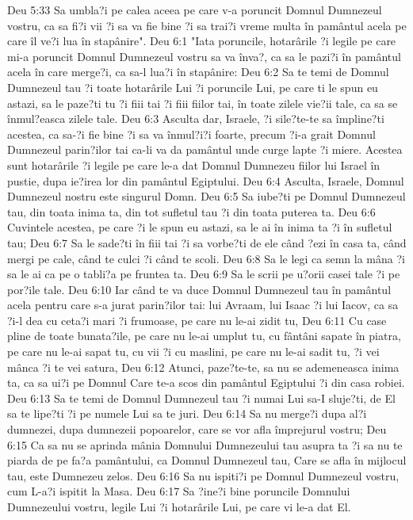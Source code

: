 Deu 5:33  Sa umbla?i pe calea aceea pe care v-a poruncit Domnul Dumnezeul vostru, ca sa fi?i vii ?i sa va fie bine ?i sa trai?i vreme multa în pamântul acela pe care îl ve?i lua în stapânire".
Deu 6:1  "Iata poruncile, hotarârile ?i legile pe care mi-a poruncit Domnul Dumnezeul vostru sa va înva?, ca sa le pazi?i în pamântul acela în care merge?i, ca sa-l lua?i în stapânire:
Deu 6:2  Sa te temi de Domnul Dumnezeul tau ?i toate hotarârile Lui ?i poruncile Lui, pe care ti le spun eu astazi, sa le paze?ti tu ?i fiii tai ?i fiii fiilor tai, în toate zilele vie?ii tale, ca sa se înmul?easca zilele tale.
Deu 6:3  Asculta dar, Israele, ?i sile?te-te sa împline?ti acestea, ca sa-?i fie bine ?i sa va înmul?i?i foarte, precum ?i-a grait Domnul Dumnezeul parin?ilor tai ca-li va da pamântul unde curge lapte ?i miere. Acestea sunt hotarârile ?i legile pe care le-a dat Domnul Dumnezeu fiilor lui Israel în pustie, dupa ie?irea lor din pamântul Egiptului.
Deu 6:4  Asculta, Israele, Domnul Dumnezeul nostru este singurul Domn.
Deu 6:5  Sa iube?ti pe Domnul Dumnezeul tau, din toata inima ta, din tot sufletul tau ?i din toata puterea ta.
Deu 6:6  Cuvintele acestea, pe care ?i le spun eu astazi, sa le ai în inima ta ?i în sufletul tau;
Deu 6:7  Sa le sade?ti în fiii tai ?i sa vorbe?ti de ele când ?ezi în casa ta, când mergi pe cale, când te culci ?i când te scoli.
Deu 6:8  Sa le legi ca semn la mâna ?i sa le ai ca pe o tabli?a pe fruntea ta.
Deu 6:9  Sa le scrii pe u?orii casei tale ?i pe por?ile tale.
Deu 6:10  Iar când te va duce Domnul Dumnezeul tau în pamântul acela pentru care s-a jurat parin?ilor tai: lui Avraam, lui Isaac ?i lui Iacov, ca sa ?i-l dea cu ceta?i mari ?i frumoase, pe care nu le-ai zidit tu,
Deu 6:11  Cu case pline de toate bunata?ile, pe care nu le-ai umplut tu, cu fântâni sapate în piatra, pe care nu le-ai sapat tu, cu vii ?i cu maslini, pe care nu le-ai sadit tu, ?i vei mânca ?i te vei satura,
Deu 6:12  Atunci, paze?te-te, sa nu se ademeneasca inima ta, ca sa ui?i pe Domnul Care te-a scos din pamântul Egiptului ?i din casa robiei.
Deu 6:13  Sa te temi de Domnul Dumnezeul tau ?i numai Lui sa-I sluje?ti, de El sa te lipe?ti ?i pe numele Lui sa te juri.
Deu 6:14  Sa nu merge?i dupa al?i dumnezei, dupa dumnezeii popoarelor, care se vor afla împrejurul vostru;
Deu 6:15  Ca sa nu se aprinda mânia Domnului Dumnezeului tau asupra ta ?i sa nu te piarda de pe fa?a pamântului, ca Domnul Dumnezeul tau, Care se afla în mijlocul tau, este Dumnezeu zelos.
Deu 6:16  Sa nu ispiti?i pe Domnul Dumnezeul vostru, cum L-a?i ispitit la Masa.
Deu 6:17  Sa ?ine?i bine poruncile Domnului Dumnezeului vostru, legile Lui ?i hotarârile Lui, pe care vi le-a dat El.

